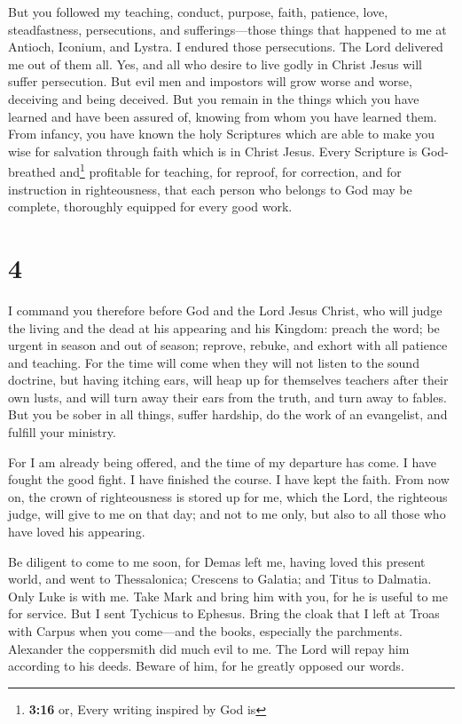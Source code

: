  But you followed my teaching, conduct, purpose, faith,
patience, love, steadfastness,  persecutions, and
sufferings---those things that happened to me at Antioch, Iconium, and
Lystra. I endured those persecutions. The Lord delivered me out of them
all.  Yes, and all who desire to live godly in Christ
Jesus will suffer persecution.  But evil men and
impostors will grow worse and worse, deceiving and being deceived.
 But you remain in the things which you have learned and
have been assured of, knowing from whom you have learned them.
 From infancy, you have known the holy Scriptures which
are able to make you wise for salvation through faith which is in Christ
Jesus.  Every Scripture is God-breathed and\footnote{\textbf{3:16}
  or, Every writing inspired by God is} profitable for teaching, for
reproof, for correction, and for instruction in righteousness,
 that each person who belongs to God may be complete,
thoroughly equipped for every good work.

\hypertarget{section-3}{%
\section{4}\label{section-3}}

 I command you therefore before God and the Lord Jesus
Christ, who will judge the living and the dead at his appearing and his
Kingdom:  preach the word; be urgent in season and out of
season; reprove, rebuke, and exhort with all patience and teaching.
 For the time will come when they will not listen to the
sound doctrine, but having itching ears, will heap up for themselves
teachers after their own lusts,  and will turn away their
ears from the truth, and turn away to fables.  But you be
sober in all things, suffer hardship, do the work of an evangelist, and
fulfill your ministry.

 For I am already being offered, and the time of my
departure has come.  I have fought the good fight. I have
finished the course. I have kept the faith.  From now on,
the crown of righteousness is stored up for me, which the Lord, the
righteous judge, will give to me on that day; and not to me only, but
also to all those who have loved his appearing.

 Be diligent to come to me soon,  for Demas
left me, having loved this present world, and went to Thessalonica;
Crescens to Galatia; and Titus to Dalmatia.  Only Luke is
with me. Take Mark and bring him with you, for he is useful to me for
service.  But I sent Tychicus to Ephesus. 
Bring the cloak that I left at Troas with Carpus when you come---and the
books, especially the parchments.  Alexander the
coppersmith did much evil to me. The Lord will repay him according to
his deeds.  Beware of him, for he greatly opposed our
words.

